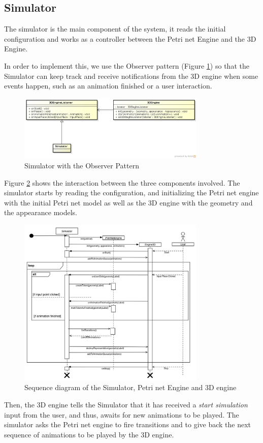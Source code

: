 \subsection{Simulator}

The simulator is the main component of the system, it reads the initial configuration and works as a controller between the Petri net Engine and the 3D Engine.

In order to implement this, we use the Observer pattern (Figure \ref{fig:observer-pattern}) so that the Simulator can keep track and receive notifications from the 3D engine when some events happen, such as an animation finished or a user interaction.

\begin{figure}[htp]
\begin{center}
  \includegraphics[width=0.8\textwidth]{image/ObserverPattern.png}
  \caption{Simulator with the Observer Pattern}
  \label{fig:observer-pattern}
\end{center}
\end{figure}

Figure \ref{fig:sd-engines} shows the interaction between the three components involved. The simulator starts by reading the configuration, and initializing the Petri net engine with the initial Petri net model as well as the 3D engine with the geometry and the appearance models. 

\begin{figure}[htp]
\begin{center}
  \includegraphics[width=0.8\textwidth]{image/sequence.png}
  \caption{Sequence diagram of the Simulator, Petri net Engine and 3D engine}
  \label{fig:sd-engines}
\end{center}
\end{figure}

Then, the 3D engine tells the Simulator that it has received a \textit{start simulation} input from the user, and thus, awaits for new animations to be played. The simulator asks the Petri net engine to fire transitions and to give back the next sequence of animations to be played by the 3D engine.